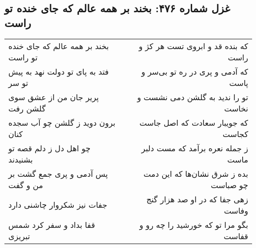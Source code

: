 \begin{center}
\section*{غزل شماره ۴۷۶: بخند بر همه عالم که جای خنده تو راست}
\label{sec:0476}
\begin{longtable}{l p{0.5cm} r}
بخند بر همه عالم که جای خنده تو راست
&&
که بنده قد و ابروی تست هر کژ و راست
\\
فتد به پای تو دولت نهد به پیش تو سر
&&
که آدمی و پری در ره تو بی‌سر و پاست
\\
پریر جان من از عشق سوی گلشن رفت
&&
تو را ندید به گلشن دمی نشست و نخاست
\\
برون دوید ز گلشن چو آب سجده کنان
&&
که جویبار سعادت که اصل جاست کجاست
\\
چو اهل دل ز دلم قصه تو بشنیدند
&&
ز جمله نعره برآمد که مست دلبر ماست
\\
پس آدمی و پری جمع گشت بر من و گفت
&&
بده ز شرق نشان‌ها که این دمت چو صباست
\\
جفات نیز شکروار چاشنی دارد
&&
زهی جفا که در او صد هزار گنج وفاست
\\
قفا بداد و سفر کرد شمس تبریزی
&&
بگو مرا تو که خورشید را چه رو و قفاست
\\
\end{longtable}
\end{center}
